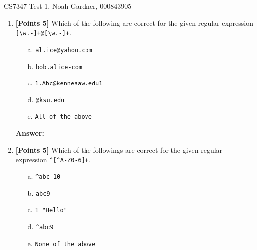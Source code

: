 \documentclass[12pt]{article}
\newcommand\tab[1][1cm]{\hspace*{#1}}
\newcommand\n{\newline}
\begin{document}
CS7347 Test 1, Noah Gardner, 000843905\n

\begin{enumerate}
    \item \textbf{[Points 5]} Which of the following are correct for the given
          regular expression \verb/[\w.-]+@[\w.-]+/.
          \begin{enumerate}
              \item [a.] \verb/al.ice@yahoo.com/
              \item [b.] \verb/bob.alice-com/
              \item [c.] \verb/1.Abc@kennesaw.edu1/
              \item [d.] \verb/@ksu.edu/
              \item [e.] \verb/All of the above/
          \end{enumerate}

          \textbf{Answer:}

    \item \textbf{[Points 5]} Which of the followings are correct for the given
          regular expression \verb/^[^A-Z0-6]+/.
          \begin{enumerate}
              \item [a.] \verb/^abc 10/
              \item [b.] \verb/abc9/
              \item [c.] \verb/1 "Hello"/
              \item [d.] \verb/^abc9/
              \item [e.] \verb/None of the above/
          \end{enumerate}


\end{enumerate}
\end{document}
